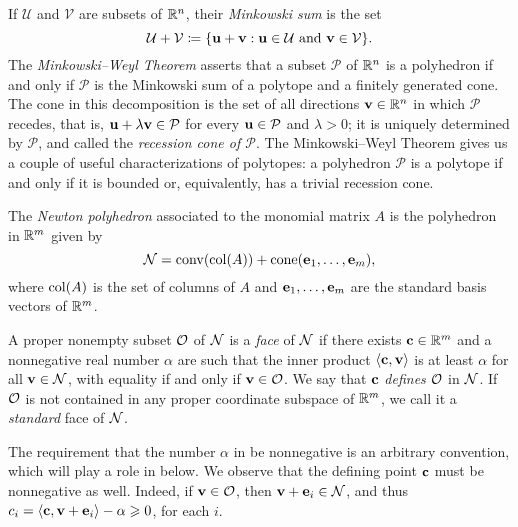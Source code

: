 \documentclass{amsart}
\begin{document}
If $\mathcal{U}$ and $\mathcal{V}$ are subsets of $\mathbb{R}^n$, their \emph{Minkowski sum} is the set
\[\mathcal{U}+\mathcal{V} \coloneqq \{\mathbf{u}+\mathbf{v}: \mathbf{u}\in \mathcal{U}\text{ and }\mathbf{v}\in \mathcal{V}\}.\]
The \emph{Minkowski--Weyl Theorem} asserts that a subset $\mathcal{P}$ of $\mathbb{R}^n$ is a polyhedron if and only if $\mathcal{P}$ is the Minkowski sum of a polytope and a finitely generated cone.
The cone in this decomposition is the set of all directions $\mathbf{v} \in \mathbb{R}^n$ in which $\mathcal{P}$ recedes, that is, $\mathbf{u} + \lambda \mathbf{v} \in \mathcal{P}$ for every $\mathbf{u} \in \mathcal{P}$ and $\lambda > 0$; it is uniquely determined by $\mathcal{P}$, and called the \emph{recession cone of $\mathcal{P}$}.
The Minkowski--Weyl Theorem gives us a couple of useful characterizations of polytopes: a polyhedron $\mathcal{P}$ is a polytope if and only if it is bounded or, equivalently, has a trivial recession cone.

\begin{definition}
The \emph{Newton polyhedron} associated to the monomial matrix $A$ is the polyhedron in $\mathbb{R}^m$ given by
\[ \mathcal{N} = \operatorname{conv}( \operatorname{col}(A) ) + \operatorname{cone}( \mathbf{e}_1, \ldots, \mathbf{e}_m), \]
where $\operatorname{col}(A)$ is the set of columns of $A$ and $\mathbf{e}_1, \ldots, \mathbf{e}_m$ are the standard basis vectors of $\mathbb{R}^m$.
\end{definition}

\begin{definition}[Faces]
   \label{defn: face}
   A proper nonempty subset $\mathcal{O}$ of $\mathcal{N}$ is a \emph{face} of $\mathcal{N}$ if there exists $\mathbf{c} \in \mathbb{R}^m$ and a nonnegative real number $\alpha$ are such that the inner product $\langle \mathbf{c}, \mathbf{v} \rangle$ is at least $\alpha$ for all $\mathbf{v} \in \mathcal{N}$, with equality if and only if $\mathbf{v} \in \mathcal{O}$.
   We say that $\mathbf{c}$ \emph{defines} $\mathcal{O}$ in $\mathcal{N}$.
   If $\mathcal{O}$ is not contained in any proper coordinate subspace of $\mathbb{R}^m$, we call it a \emph{standard} face of $\mathcal{N}$.
\end{definition}

\begin{remark}
   \label{rmk: nonnegativity of defining point}
   The requirement that the number $\alpha$ in  be nonnegative is an arbitrary convention, which will play a role in  below.
   We observe that the defining point $\mathbf{c}$ must be nonnegative as well.
   Indeed, if $\mathbf{v} \in \mathcal{O}$, then $\mathbf{v} + \mathbf{e}_i \in \mathcal{N}$, and thus $c_i = \langle \mathbf{c}, \mathbf{v} + \mathbf{e}_i \rangle -\alpha \geqslant 0$, for each $i$.
\end{remark}
\end{document}
